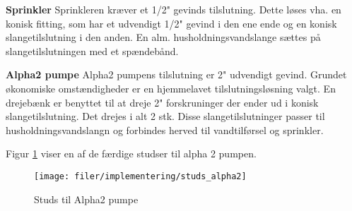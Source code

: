 
\textbf{Sprinkler} \newline
Sprinkleren kræver et 1/2" gevinds tilslutning. Dette løses vha. en konisk fitting, som har et udvendigt 1/2" gevind i den ene ende og en konisk slangetilslutning i den anden. En alm. husholdningsvandslange sættes på slangetilslutningen med et spændebånd. 

\textbf{Alpha2 pumpe}  \newline
Alpha2 pumpens tilslutning er 2" udvendigt gevind. Grundet økonomiske omstændigheder er en hjemmelavet tilslutningsløsning valgt. En drejebænk er benyttet til at dreje 2" forskruninger der ender ud i konisk slangetilslutning. Det drejes i alt 2 stk. Disse slangetilslutninger passer til husholdningsvandslangn og forbindes herved til vandtilførsel og sprinkler.

Figur \ref{lab:fitting_alpha2} viser en af de færdige studser til alpha 2 pumpen. 

\begin{figure}[htb]
\centering
{\texttt{[image: filer/implementering/studs\_alpha2]}}
\caption{Studs til Alpha2 pumpe}
\label{lab:fitting_alpha2}
\end{figure}

